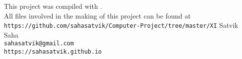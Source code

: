
\thispagestyle{empty}\addtocounter{page}{-1}
\hspace{0pt}
\vfill
\begin{center}
This project was compiled with \XeLaTeX .\\
\vspace{5mm}
All files involved in the making of this project can be found at
{\tt https://github.com/sahasatvik/Computer-Project/tree/master/XI}
\vfill
{\fontsize{24}{24}\JennaSue Satvik Saha}\\
{\fontsize{10}{8}\tt sahasatvik@gmail.com}\\
\vspace{-1mm}
{\fontsize{10}{8}\tt https://sahasatvik.github.io}
\end{center}
\hspace{0pt}